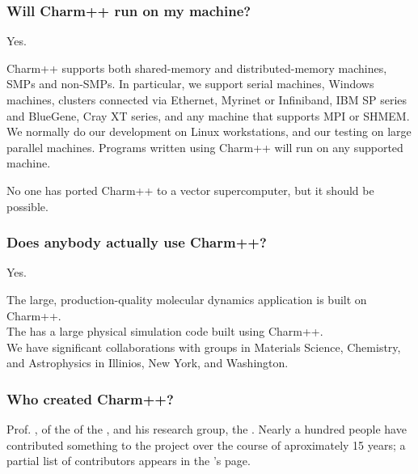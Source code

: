 \subsubsection{Will Charm++ run on my machine?}

Yes.

Charm++ supports both shared-memory and distributed-memory machines,
SMPs and non-SMPs. In particular, we support serial machines, Windows
machines, clusters connected via Ethernet, Myrinet or Infiniband, IBM
SP series and BlueGene, Cray XT series, and any machine that supports MPI
or SHMEM. We normally do our development on Linux workstations, and
our testing on large parallel machines. Programs written using Charm++
will run on any supported machine.

No one has ported Charm++ to a vector supercomputer, but it should be
possible.

\subsubsection{Does anybody actually use Charm++?}

Yes.

The large, production-quality molecular dynamics application 
is built on Charm++.\\
The 
has a large physical simulation code built using Charm++.\\
We have significant collaborations with groups in Materials Science,
Chemistry, and Astrophysics in Illinios, New York, and Washington.

\subsubsection{Who created Charm++?}

Prof. , of the
of the ,
and his research group, the .
Nearly a hundred people have contributed something
to the project over the course of aproximately 15 years; a partial list
of contributors appears in the 's page.

